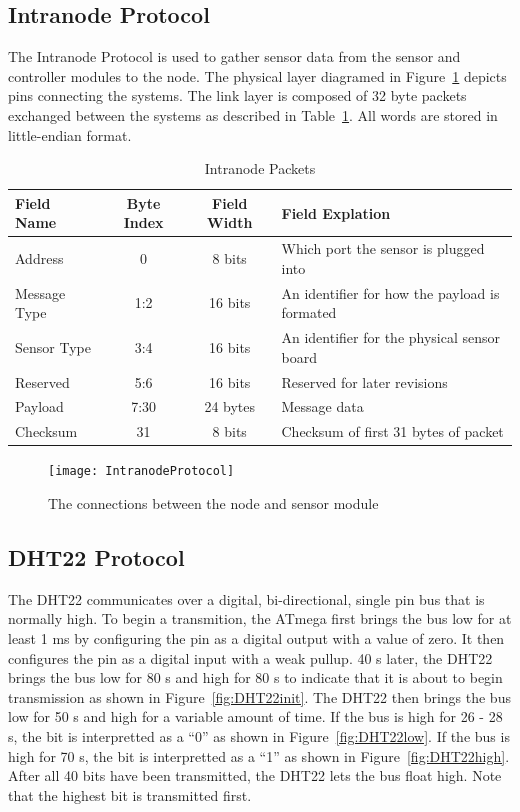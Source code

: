 		\subsection{Intranode Protocol}
			The Intranode Protocol is used to gather sensor data from the sensor and controller modules to the node. The physical layer diagramed in Figure~\ref{fig:IntranodePhysical} depicts pins connecting the systems. The link layer is composed of 32 byte packets exchanged between the systems as described in Table~\ref{tab:IntranodeLink}. All words are stored in little-endian format.
			\begin{table}[h!]
				\centering
				\caption{Intranode Packets}
				\label{tab:IntranodeLink}
				\begin{tabular}{l c c l}
					\toprule[1.2pt]
					Field Name & Byte Index & Field Width & Field Explation\\ \hline
					Address & 0 & 8 bits & Which port the sensor is plugged into\\
					Message Type & 1:2 & 16 bits & An identifier for how the payload is formated\\
					Sensor Type & 3:4 & 16 bits & An identifier for the physical sensor board\\
					Reserved & 5:6 & 16 bits & Reserved for later revisions\\
					Payload & 7:30 & 24 bytes & Message data\\
					Checksum & 31 & 8 bits & Checksum of first 31 bytes of packet\\ \bottomrule[1.2pt]
				\end{tabular}
			\end{table}
			
			\begin{figure}[h!]
				\centering
				\texttt{[image: IntranodeProtocol]}
				\caption{The connections between the node and sensor module}
				\label{fig:IntranodePhysical}
			\end{figure}
	
		\subsection{DHT22 Protocol}
			The DHT22 communicates over a digital, bi-directional, single pin bus that is normally high. To begin a transmition, the ATmega first brings the bus low for at least 1 ms by configuring the pin as a digital output with a value of zero. It then configures the pin as a digital input with a weak pullup. 40 \textmu s later, the DHT22 brings the bus low for 80 \textmu s and high for 80 \textmu s to indicate that it is about to begin transmission as shown in Figure~\ref{fig:DHT22init}. The DHT22 then brings the bus low for 50 \textmu s and high for a variable amount of time. If the bus is high for 26 - 28 \textmu s, the bit is interpretted as a ``0'' as shown in Figure~\ref{fig:DHT22low}. If the bus is high for 70 \textmu s, the bit is interpretted as a ``1'' as shown in Figure~\ref{fig:DHT22high}. After all 40 bits have been transmitted, the DHT22 lets the bus float high. Note that the highest bit is transmitted first. %
			
